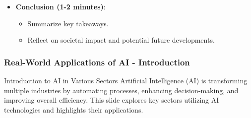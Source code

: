 \documentclass[aspectratio=169]{beamer}
\begin{document}
\begin{frame}[fragile]
\begin{enumerate}
\begin{itemize}
\begin{itemize}
\begin{itemize}
                            \end{itemize}
                    \end{itemize}
                \item \textbf{Conclusion (1-2 minutes)}:
                    \begin{itemize}
                        \item Summarize key takeaways.
                        \item Reflect on societal impact and potential future developments.
                    \end{itemize}
            \end{itemize}
    \end{enumerate}
\end{frame}

\begin{frame}[fragile]
    \frametitle{Real-World Applications of AI - Introduction}
    \begin{block}{Introduction to AI in Various Sectors}
        Artificial Intelligence (AI) is transforming multiple industries by automating processes, enhancing decision-making, and improving overall efficiency. 
        This slide explores key sectors utilizing AI technologies and highlights their applications.
    \end{block}
\end{frame}
\end{document}
